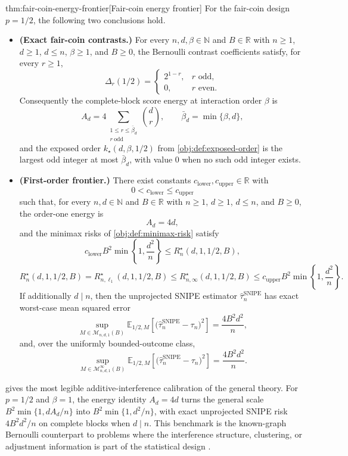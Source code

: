 \begin{theoremv}{thm:fair-coin-energy-frontier}[Fair-coin energy frontier]
For the fair-coin design \(p=1/2\), the following two conclusions hold.

\begin{itemize}
\item \textbf{(Exact fair-coin contrasts.)} For every \(n,d,\beta\in\mathbb N\) and \(B\in\mathbb R\) with \(n\ge 1\), \(d\ge 1\), \(d\le n\), \(\beta\ge 1\), and \(B\ge 0\), the Bernoulli contrast coefficients satisfy, for every \(r\ge 1\),
\[
\Delta_r(1/2)
=
\begin{cases}
2^{1-r}, & r \text{ odd},\\
0, & r \text{ even}.
\end{cases}
\]
Consequently the complete-block score energy at interaction order \(\beta\) is
\[
A_d
=
4\sum_{\substack{1\le r\le \bar\beta_d\\ r\ \mathrm{odd}}}\binom dr,
\qquad
\bar\beta_d=\min\{\beta,d\},
\]
and the exposed order \(k_\star(d,\beta,1/2)\) from \cref{obj:def:exposed-order} is the largest odd integer at most \(\bar\beta_d\), with value \(0\) when no such odd integer exists.

\item \textbf{(First-order frontier.)} There exist constants \(c_{\mathrm{lower}},c_{\mathrm{upper}}\in\mathbb R\) with
\[
0<c_{\mathrm{lower}}\le c_{\mathrm{upper}}
\]
such that, for every \(n,d\in\mathbb N\) and \(B\in\mathbb R\) with \(n\ge 1\), \(d\ge 1\), \(d\le n\), and \(B\ge 0\), the order-one energy is
\[
A_d=4d,
\]
and the minimax risks of \cref{obj:def:minimax-risk} satisfy
\[
c_{\mathrm{lower}}B^2\min\!\left\{1,\frac{d^2}{n}\right\}
\le
R_n^\star(d,1,1/2,B),
\]
\[
R_n^\star(d,1,1/2,B)
=
R_{n,\ell_1}^\star(d,1,1/2,B)
\le
R_{n,\infty}^\star(d,1,1/2,B)
\le
c_{\mathrm{upper}}B^2\min\!\left\{1,\frac{d^2}{n}\right\}.
\]
If additionally \(d\mid n\), then the unprojected SNIPE estimator \(\widehat\tau_n^{\mathrm{SNIPE}}\) has exact worst-case mean squared error
\[
\sup_{M\in\mathcal M_{n,d,1}(B)}
\mathbb E_{1/2,M}\!\left[
\bigl(\widehat\tau_n^{\mathrm{SNIPE}}-\tau_n\bigr)^2
\right]
=
\frac{4B^2d^2}{n},
\]
and, over the uniformly bounded-outcome class,
\[
\sup_{M\in\mathcal M_{n,d,1}^{\infty}(B)}
\mathbb E_{1/2,M}\!\left[
\bigl(\widehat\tau_n^{\mathrm{SNIPE}}-\tau_n\bigr)^2
\right]
=
\frac{4B^2d^2}{n}.
\]
\end{itemize}
\end{theoremv}

 gives the most legible additive-interference calibration of the general theory. For \(p=1/2\) and \(\beta=1\), the energy identity \(A_d=4d\) turns the general scale \(B^2\min\{1,dA_d/n\}\) into \(B^2\min\{1,d^2/n\}\), with exact unprojected SNIPE risk \(4B^2d^2/n\) on complete blocks when \(d\mid n\). This benchmark is the known-graph Bernoulli counterpart to problems where the interference structure, clustering, or adjustment information is part of the statistical design \citep{YuAiroldiBorgsChayes2022,EichhornKhanUganderYu2026,WangLi2026}.
